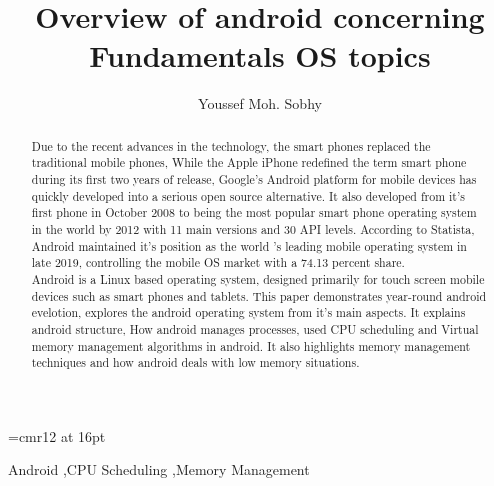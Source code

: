 \documentclass[preprint,12pt]{elsarticle}
\begin{document}
\begin{frontmatter}


\font\myfont=cmr12 at 16pt
\title{{\myfont\textbf{ Overview of android concerning Fundamentals OS topics}}}


\author{Youssef Moh. Sobhy}


\begin{abstract}


Due to the recent advances in the technology, the smart phones replaced the traditional mobile phones, While the Apple iPhone redefined the term smart phone during its first two years of release, Google's Android platform for mobile devices has quickly developed into a serious open source alternative.
It also developed from it's first phone in October 2008 to being the most popular smart phone operating system in the world by 2012 with 11 main versions and 30 API levels. According to Statista, Android maintained it's position as the world 's leading mobile operating system in late 2019, controlling the mobile OS market with a 74.13 percent share.\\
Android is a Linux based operating system, designed primarily for touch screen mobile devices such as smart phones and tablets. This paper demonstrates year-round android evelotion, explores the android operating system from it's main aspects.
It explains android structure, How android manages processes, used CPU scheduling and Virtual memory management algorithms in android. It also highlights memory management techniques and how android deals with low memory situations.

\end{abstract}

\begin{keyword}
Android \sep CPU Scheduling  \sep Memory Management

\end{keyword}

\end{frontmatter}
\end{document}

